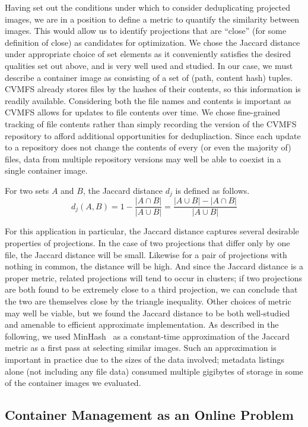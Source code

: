 \documentclass[sigconf]{acmart}
\begin{document}
    Having set out the conditions under which to consider deduplicating projected images,
we are in a position to define a metric to quantify the similarity between images.
This would allow us to identify projections that are ``close'' (for some definition of close) as candidates for optimization.
We chose the Jaccard distance under appropriate choice of set elements as it conveniently satisfies the desired qualities set out above,
and is very well used and studied.
In our case, we must describe a container image as consisting of a set of (path, content hash) tuples.
CVMFS already stores files by the hashes of their contents,
so this information is readily available.
Considering both the file names and contents is important as CVMFS allows for updates to file contents over time.
We chose fine-grained tracking of file contents rather than simply recording the version of the CVMFS repository to afford additional opportunities for dedupliaction.
Since each update to a repository does not change the contents of every (or even the majority of) files,
data from multiple repository versions may well be able to coexist in a single container image.

For two sets $A$ and $B$,
the Jaccard distance $d_j$ is defined as follows.
\[
d_j(A, B) = 1 - \frac{|A \cap B|}{|A \cup B|} = \frac{|A \cup B| - |A \cap B|}{|A \cup B|}
\]


For this application in particular,
the Jaccard distance captures several desirable properties of projections.
In the case of two projections that differ only by one file,
the Jaccard distance will be small.
Likewise for a pair of projections with nothing in common,
the distance will be high.
And since the Jaccard distance is a proper metric,
related projections will tend to occur in clusters;
if two projections are both found to be extremely close to a third projection,
we can conclude that the two are themselves close by the triangle inequality.
Other choices of metric may well be viable,
but we found the Jaccard distance to be both well-studied and amenable to efficient approximate implementation.
As described in the following,
we used MinHash~\cite{minhash} as a constant-time approximation of the Jaccard metric as a first pass at selecting similar images.
Such an approximation is important in practice due to the sizes of the data involved;
metadata listings alone (not including any file data) consumed multiple gigibytes of storage in some of the container images we evaluated.

\subsection{Container Management as an Online Problem}
\end{document}
